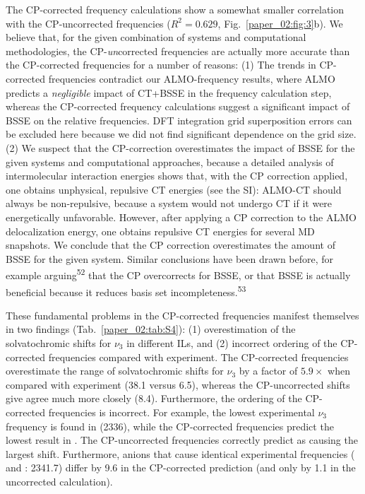 The CP-corrected frequency calculations show a somewhat smaller correlation with the CP-uncorrected frequencies (\(R^2 = 0.629\), Fig.~\ref{paper_02:fig:3}b). We believe that, for the given combination of systems and computational methodologies, the CP-\emph{un}corrected frequencies are actually more accurate than the CP-corrected frequencies for a number of reasons: (1) The trends in CP-corrected frequencies contradict our ALMO-frequency results, where ALMO predicts a \emph{negligible} impact of CT+BSSE in the frequency calculation step, whereas the CP-corrected frequency calculations suggest a significant impact of BSSE on the relative frequencies. DFT integration grid superposition errors can be excluded here because we did not find significant dependence on the grid size. (2) We suspect that the CP-correction overestimates the impact of BSSE for the given systems and computational approaches, because a detailed analysis of intermolecular interaction energies shows that, with the CP correction applied, one obtains unphysical, repulsive CT energies (see the SI): ALMO-CT should always be non-repulsive, because a system would not undergo CT if it were energetically unfavorable. However, after applying a CP correction to the ALMO delocalization energy, one obtains repulsive CT energies for several MD snapshots. We conclude that the CP correction overestimates the amount of BSSE for the given system. Similar conclusions have been drawn before, for example arguing\textsuperscript{52} that the CP overcorrects for BSSE, or that BSSE is actually beneficial because it reduces basis set incompleteness.\textsuperscript{53}

These fundamental problems in the CP-corrected frequencies manifest themselves in two findings (Tab.~\ref{paper_02:tab:S4}): (1) overestimation of the solvatochromic shifts for \(\nu_{3}\) in different ILs, and (2) incorrect ordering of the CP-corrected frequencies compared with experiment. The CP-corrected frequencies overestimate the range of solvatochromic shifts for \(\nu_{3}\) by a factor of \(5.9 \times\) when compared with experiment (\SI{38.1}{\wavenumber} versus \SI{6.5}{\wavenumber}), whereas the CP-uncorrected shifts give agree much more closely (\SI{8.4}{\wavenumber}). Furthermore, the ordering of the CP-corrected frequencies is incorrect. For example, the lowest experimental \(\nu_{3}\) frequency is found in \ce{[C4C1im][SCN]} (\SI{2336}{\wavenumber}), while the CP-corrected frequencies predict the lowest result in \ce{[C4C1im][DCA]}. The CP-uncorrected frequencies correctly predict \ce{[SCN]-} as causing the largest shift. Furthermore, anions that cause identical experimental frequencies (\ce{[Tf2N]-} and \ce{[BF4]-}: \SI{2341.7}{\wavenumber}) differ by \SI{9.6}{\wavenumber} in the CP-corrected prediction (and only by \SI{1.1}{\wavenumber} in the uncorrected calculation).

